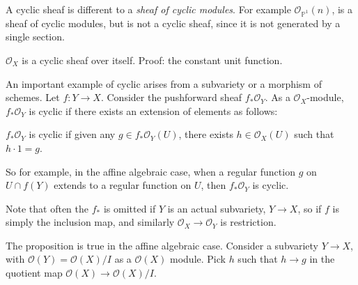     
    
    \begin{rem} A cyclic sheaf is different to a \emph{sheaf of cyclic modules}. For example
    \( \mathcal{O}_{\mathbb{P}^1}(n)\), is a sheaf of cyclic modules, but is not a cyclic sheaf, since it is not generated by a single section. %
    \end{rem} 
        
    \begin{ex}
    \( \mathcal{O}_X\) is a cyclic sheaf over itself.
    Proof: the constant unit function.
    \end{ex}

    An important example of cyclic arises from a subvariety or a morphism of schemes. Let \(f : Y \rightarrow X\). Consider the pushforward sheaf \( f_{*} \mathcal{O}_Y\). As a \( \mathcal{O}_X\)-module, \( f_{*} \mathcal{O}_Y\) is cyclic if there exists an extension of elements as follows:

    \begin{prop}
    \(f_{*} \mathcal{O}_Y\) is cyclic if given any \(g \in f_{*} \mathcal{O}_Y(U) \), 
    there exists \(h \in \mathcal{O}_X(U)\) such that \(h \cdot 1 = g\).
    \end{prop}
    So for example, in the affine algebraic case, when a regular function \(g\) on \(U \cap f(Y)\) extends to a regular function on \(U\), then \(f_{*} \mathcal{O}_Y\) is cyclic.
    
    \begin{note} Note that often the \(f_{*}\) is omitted if \(Y\) is an actual subvariety, \(Y \rightarrow X\), so if \(f\) is simply the inclusion map, and similarly \( \mathcal{O}_X \rightarrow \mathcal{O}_Y\) is restriction.
    \end{note}
    
    The proposition is true in the affine algebraic case. Consider a subvariety \( Y \rightarrow X\), with  \(\mathcal{O}(Y) = \mathcal{O}(X)/I\) as a \( \mathcal{O}(X)\) module. Pick \(h\) such that \(h \rightarrow g\) in the quotient map \( \mathcal{O}(X) \rightarrow \mathcal{O}(X)/I\).
    
